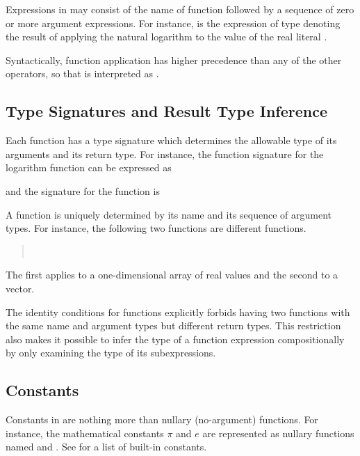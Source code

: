 Expressions in \Stan may consist of the name of function followed by a
sequence of zero or more argument expressions.  For instance,
 is the expression of type  denoting the
result of applying the natural logarithm to the value of the real
literal .

Syntactically, function application has higher precedence than any of
the other operators, so that  is interpreted as
.

\subsection{Type Signatures and Result Type Inference}

Each function has a type signature which determines the allowable type
of its arguments and its return type.  For instance, the function
signature for the logarithm function can be expressed as
%
\begin{quote}
\end{quote}
%
and the signature for the  function is
%
\begin{quote}
\end{quote}
%
A function is uniquely determined by its name and its sequence of
argument types.  For instance, the following two functions are
different functions.
%
\begin{quote}
\\
\end{quote}
%
The first applies to a one-dimensional array of real values and the
second to a vector.

The identity conditions for functions explicitly forbids having two
functions with the same name and argument types but different return
types.  This restriction also makes it possible to infer the type of a
function expression compositionally by only examining the type of its
subexpressions. 

\subsection{Constants}

Constants in \Stan are nothing more than nullary (no-argument)
functions.  For instance, the mathematical constants $\pi$ and $e$ are
represented as nullary functions named  and .
See  for a list of built-in constants.

